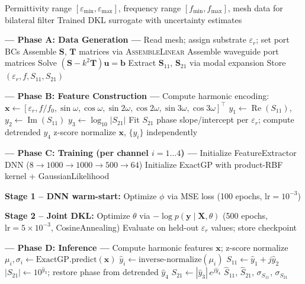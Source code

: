 \documentclass[conference]{IEEEtran}
\begin{document}
\begin{algorithm}[t]
\caption{Deep Kernel Learning MOR Pipeline}
\label{alg:pipeline}
\begin{algorithmic}[1]
\Require Permittivity range $[\varepsilon_{\min}, \varepsilon_{\max}]$, frequency range $[f_{\min}, f_{\max}]$, mesh data for bilateral filter
\Ensure Trained DKL surrogate with uncertainty estimates

\Statex \textbf{--- Phase A: Data Generation ---}
    \State Read mesh; assign substrate $\varepsilon_r$; set port BCs
    \State Assemble $\mathbf{S}$, $\mathbf{T}$ matrices via \textsc{AssembleLinear}
        \State Assemble waveguide port matrices
        \State Solve $(\mathbf{S} - k^2\mathbf{T}) \mathbf{u} = \mathbf{b}$
        \State Extract $\mathbf{S}_{11}$, $\mathbf{S}_{21}$ via modal expansion
        \State Store $(\varepsilon_r, f, S_{11}, S_{21})$
    \EndFor
\EndFor

\Statex \textbf{--- Phase B: Feature Construction ---}
\State Compute harmonic encoding: $\mathbf{x} \gets [\varepsilon_r, f/f_0, \sin\omega, \cos\omega, \sin 2\omega, \cos 2\omega, \sin 3\omega, \cos 3\omega]^\top$
\State $y_1 \gets \operatorname{Re}(S_{11})$, $y_2 \gets \operatorname{Im}(S_{11})$
\State $y_3 \gets \log_{10}|S_{21}|$
\State Fit $S_{21}$ phase slope/intercept per $\varepsilon_r$; compute detrended $y_4$
\State z-score normalize $\mathbf{x}$, $\{y_i\}$ independently

\Statex \textbf{--- Phase C: Training (per channel $i = 1\ldots4$) ---}
\State Initialize FeatureExtractor DNN ($8 \to 1000 \to 1000 \to 500 \to 64$)
\State Initialize ExactGP with product-RBF kernel + GaussianLikelihood

    \hspace*{2em}\textbf{Stage 1 -- DNN warm-start:}
    \State Optimize $\phi$ via MSE loss (100 epochs, $\mathrm{lr}=10^{-3}$)

    \hspace*{2em}\textbf{Stage 2 -- Joint DKL:}
    \State Optimize $\theta$ via $-\log p(\mathbf{y} \mid \mathbf{X}, \theta)$ (500 epochs, $\mathrm{lr}=5\times10^{-3}$, CosineAnnealing)
    \State Evaluate on held-out $\varepsilon_r$ values; store checkpoint

\Statex \textbf{--- Phase D: Inference ---}
    \State Compute harmonic features $\mathbf{x}$; z-score normalize
        \State $\mu_i, \sigma_i \gets \text{ExactGP.predict}(\mathbf{x})$
        \State $\hat{y}_i \gets \text{inverse-normalize}(\mu_i)$
    \EndFor
    \State $S_{11} \gets \hat{y}_1 + j\hat{y}_2$
    \State $|S_{21}| \gets 10^{\hat{y}_3}$; restore phase from detrended $\hat{y}_4$
    \State $S_{21} \gets |\hat{y}_3| \, e^{j\hat{y}_4}$
\EndFor
\State \Return $\hat{S}_{11}$, $\hat{S}_{21}$, $\sigma_{S_{11}}$, $\sigma_{S_{21}}$
\end{algorithmic}
\end{algorithm}
\end{document}
